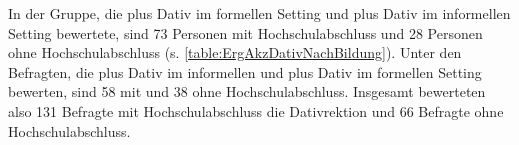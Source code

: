 In der Gruppe, die \wegen{} plus Dativ im formellen Setting und \waehrend{} plus Dativ im informellen Setting bewertete, sind 73 Personen mit Hochschulabschluss und 28 Personen ohne Hochschulabschluss (s. \autoref{table:ErgAkzDativNachBildung}). 
Unter den Befragten, die \wegen{} plus Dativ im informellen und \waehrend{} plus Dativ im formellen Setting bewerten, sind 58 mit und 38 ohne Hochschulabschluss. 
Insgesamt bewerteten also 131 Befragte mit Hochschulabschluss die Dativrektion und 66 Befragte ohne Hochschulabschluss. 
